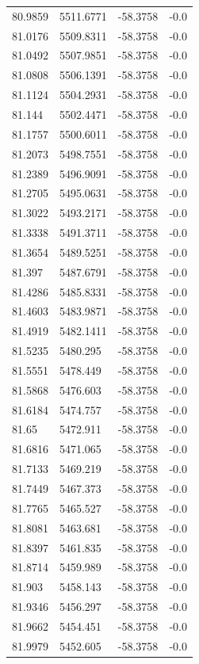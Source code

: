 \begin{table}[H]
\begin{tabular}{llll}
80.9859 & 5511.6771 & -58.3758 & -0.0 \\
81.0176 & 5509.8311 & -58.3758 & -0.0 \\
81.0492 & 5507.9851 & -58.3758 & -0.0 \\
81.0808 & 5506.1391 & -58.3758 & -0.0 \\
81.1124 & 5504.2931 & -58.3758 & -0.0 \\
81.144 & 5502.4471 & -58.3758 & -0.0 \\
81.1757 & 5500.6011 & -58.3758 & -0.0 \\
81.2073 & 5498.7551 & -58.3758 & -0.0 \\
81.2389 & 5496.9091 & -58.3758 & -0.0 \\
81.2705 & 5495.0631 & -58.3758 & -0.0 \\
81.3022 & 5493.2171 & -58.3758 & -0.0 \\
81.3338 & 5491.3711 & -58.3758 & -0.0 \\
81.3654 & 5489.5251 & -58.3758 & -0.0 \\
81.397 & 5487.6791 & -58.3758 & -0.0 \\
81.4286 & 5485.8331 & -58.3758 & -0.0 \\
81.4603 & 5483.9871 & -58.3758 & -0.0 \\
81.4919 & 5482.1411 & -58.3758 & -0.0 \\
81.5235 & 5480.295 & -58.3758 & -0.0 \\
81.5551 & 5478.449 & -58.3758 & -0.0 \\
81.5868 & 5476.603 & -58.3758 & -0.0 \\
81.6184 & 5474.757 & -58.3758 & -0.0 \\
81.65 & 5472.911 & -58.3758 & -0.0 \\
81.6816 & 5471.065 & -58.3758 & -0.0 \\
81.7133 & 5469.219 & -58.3758 & -0.0 \\
81.7449 & 5467.373 & -58.3758 & -0.0 \\
81.7765 & 5465.527 & -58.3758 & -0.0 \\
81.8081 & 5463.681 & -58.3758 & -0.0 \\
81.8397 & 5461.835 & -58.3758 & -0.0 \\
81.8714 & 5459.989 & -58.3758 & -0.0 \\
81.903 & 5458.143 & -58.3758 & -0.0 \\
81.9346 & 5456.297 & -58.3758 & -0.0 \\
81.9662 & 5454.451 & -58.3758 & -0.0 \\
81.9979 & 5452.605 & -58.3758 & -0.0 \\

\end{tabular}
\end{table}
